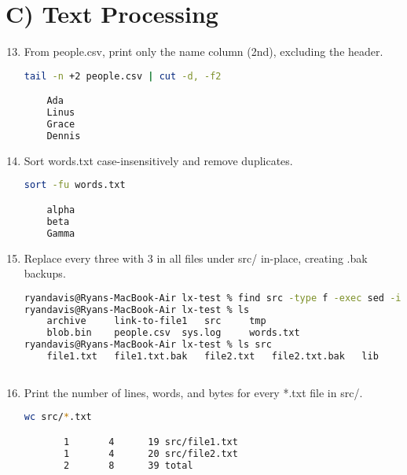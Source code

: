 \section*{C) Text Processing}
\begin{enumerate}
\setcounter{enumi}{12}
\item From people.csv, print only the name column (2nd), excluding the header. \vspace{2em}\\
\begin{lstlisting}[language=sh]
tail -n +2 people.csv | cut -d, -f2

    Ada
    Linus
    Grace
    Dennis
\end{lstlisting}

\item Sort words.txt case-insensitively and remove duplicates. \vspace{2em}\\
\begin{lstlisting}[language=sh]
sort -fu words.txt

    alpha
    beta
    Gamma
\end{lstlisting}
\item Replace every three with 3 in all files under src/ in-place, creating .bak backups. \vspace{2em}\\
\begin{lstlisting}[language=sh]
ryandavis@Ryans-MacBook-Air lx-test % find src -type f -exec sed -i .bak -E 's/\<three\>/3/g' {} +
ryandavis@Ryans-MacBook-Air lx-test % ls
    archive		link-to-file1	src		tmp
    blob.bin	people.csv	sys.log		words.txt
ryandavis@Ryans-MacBook-Air lx-test % ls src 
    file1.txt	file1.txt.bak	file2.txt	file2.txt.bak	lib
    
\end{lstlisting}
\item Print the number of lines, words, and bytes for every *.txt file in src/. \vspace{2em}\\
\begin{lstlisting}[language=sh]
wc src/*.txt

       1       4      19 src/file1.txt
       1       4      20 src/file2.txt
       2       8      39 total

\end{lstlisting}
\end{enumerate}

